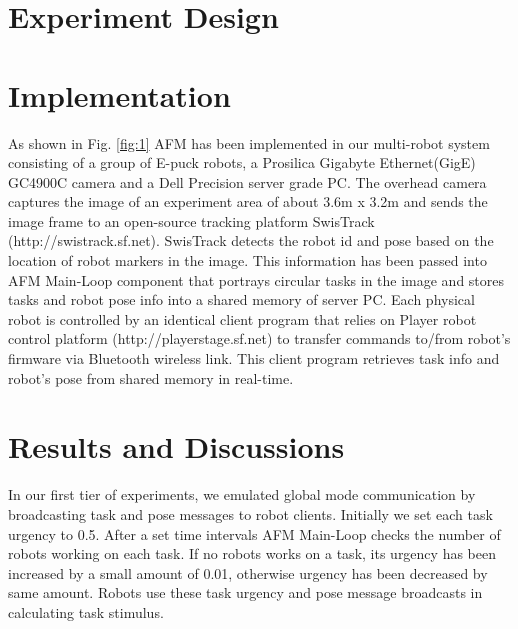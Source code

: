 \documentclass{llncs}
\begin{document}
% 
\section{Experiment Design}
\label{sec:expt-design}

\section{Implementation}
\label{sec:impl}
As shown in Fig. \ref{fig:1} AFM has been implemented in our multi-robot system consisting of a group of E-puck robots, a Prosilica Gigabyte Ethernet(GigE) GC4900C camera and a Dell Precision server grade PC. The overhead camera captures the image of an experiment area of about 3.6m x 3.2m and sends the image frame to an open-source tracking platform SwisTrack (http://swistrack.sf.net). SwisTrack detects the robot id and pose based on the location of robot markers in the image. This information has been passed into AFM Main-Loop component that portrays circular tasks in the image and stores tasks and robot pose info into a shared memory of server PC. Each physical robot is controlled by an identical client program that relies on Player robot control platform (http://playerstage.sf.net) to transfer commands to/from robot's firmware via Bluetooth wireless link. This client program retrieves task info and robot's pose from shared memory in real-time.


\section{Results and Discussions}
\label{sec:results}
In our first tier of experiments, we emulated global mode communication by broadcasting task and pose messages to robot clients. Initially we set each task urgency to 0.5. After a set time intervals AFM Main-Loop checks the number of robots working on each task. If no robots works on a task, its urgency has been increased by a small amount of 0.01, otherwise urgency has been decreased by same amount. Robots use these task urgency and pose message broadcasts in calculating task stimulus.
\end{document}
